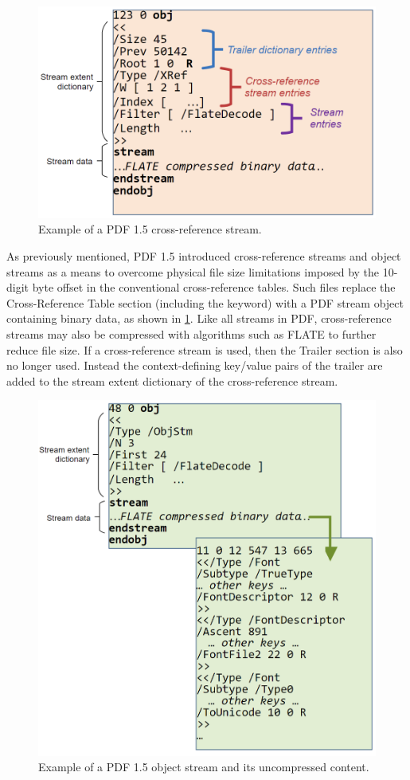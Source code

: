 \begin{figure}[t]
    \centering
    \includegraphics[width=0.65\linewidth]{figures/xrefstm.png}
    \caption{Example of a PDF 1.5 cross-reference stream.}
    \label{fig:XRefStm}
\end{figure}

As previously mentioned, PDF 1.5 introduced cross-reference streams and object streams as a means
to overcome physical file size limitations imposed by the 10-digit byte offset in the conventional
cross-reference tables.
Such files replace the Cross-Reference Table section (including the  keyword) 
with a PDF stream object containing binary data, as shown in \cref{fig:XRefStm}. 
Like all streams in PDF, cross-reference streams may also be compressed with algorithms such as FLATE 
to further reduce file size. If a cross-reference stream is used, then the Trailer section is also no
longer used. Instead the context-defining key/value pairs of the trailer are added to the stream 
extent dictionary of the cross-reference stream.

\begin{figure}[t]
    \centering
    \includegraphics[width=0.65\linewidth]{figures/ObjStm.png}
    \caption{Example of a PDF 1.5 object stream and its uncompressed content.}
    \label{fig:ObjStm}
\end{figure}

